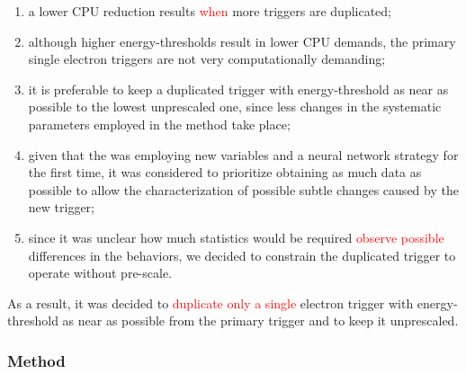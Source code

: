 \begin{enumerate}
  \item a lower CPU reduction results \textcolor{red}{when} more triggers are duplicated;
  \item although higher energy-thresholds result in lower CPU demands, the
    primary single electron triggers are not very computationally demanding;
  \item it is preferable to keep a duplicated trigger with energy-threshold as
    near as possible to the lowest unprescaled one, since less changes in the
    systematic parameters employed in the \Zee{} \tnp{} method take place;
  \item given that the \rnn{} was employing new variables and a neural network
    strategy for the first time, it was considered to prioritize obtaining as
    much data as possible to allow the characterization of possible subtle
    changes caused by the new trigger;
  \item since it was unclear how much statistics would be required \textcolor{red}{observe possible} differences in the behaviors, we decided to constrain the
    duplicated trigger to operate without pre-scale.
\end{enumerate}

As a result, it was decided to \textcolor{red}{duplicate only a single} electron trigger with energy-threshold as near as possible from the primary trigger and to keep it unprescaled.


\subsubsection{Method}\label{top:homogeneity_method}



